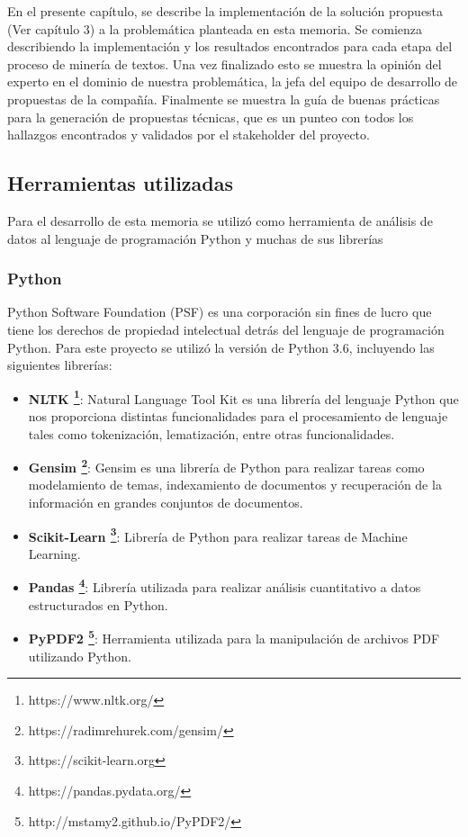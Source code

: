 
    En el presente capítulo, se describe la implementación de la solución propuesta (Ver capítulo 3) a la problemática planteada en esta memoria. Se comienza describiendo la implementación y los resultados encontrados para cada etapa del proceso de minería de textos. Una vez finalizado esto se muestra la opinión del experto en el dominio de nuestra problemática, la jefa del equipo de desarrollo de propuestas de la compañía. Finalmente se muestra la guía de buenas prácticas para la generación de propuestas técnicas, que es un punteo con todos los hallazgos encontrados y validados por el stakeholder del proyecto.
    
\subsection{Herramientas utilizadas}
    Para el desarrollo de esta memoria se utilizó como herramienta de análisis de datos al lenguaje de programación Python y muchas de sus librerías 
\subsubsection{Python}    
Python Software Foundation (PSF) es una corporación sin fines de lucro que
tiene los derechos de propiedad intelectual detrás del lenguaje de programación Python. Para este proyecto se utilizó la versión de Python 3.6, incluyendo las siguientes librerías:
    \begin{itemize}
        \item \textbf{NLTK \footnote{https://www.nltk.org/}}: Natural Language Tool Kit es una librería del lenguaje Python que nos proporciona distintas funcionalidades para el procesamiento de lenguaje tales como tokenización, lematización, entre otras funcionalidades.
        \item \textbf{Gensim \footnote{https://radimrehurek.com/gensim/}}: Gensim es una librería de Python para realizar tareas como modelamiento de temas, indexamiento de documentos y recuperación de la información en grandes conjuntos de documentos. 
        \item \textbf{Scikit-Learn \footnote{https://scikit-learn.org}}: Librería de Python para realizar tareas de Machine Learning.
        \item \textbf{Pandas \footnote{https://pandas.pydata.org/}}: Librería utilizada para realizar análisis cuantitativo a datos estructurados en Python.
        \item \textbf{PyPDF2 \footnote{http://mstamy2.github.io/PyPDF2/}}: Herramienta utilizada para la manipulación de archivos PDF utilizando Python.
    \end{itemize}
            
